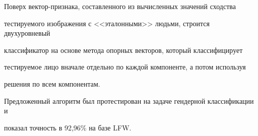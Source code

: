 Поверх вектор-признака, составленного из вычисленных значений сходства 


тестируемого изображения с <<эталонными>> людьми, строится двухуровневый 


классификатор на основе метода опорных векторов, который классифицирует 


тестируемое лицо вначале отдельно по каждой компоненте, а потом используя 


решения по всем компонентам. 





Предложенный алгоритм был протестирован на задаче гендерной классификации и 


показал точность в 92,96\% на базе LFW.





